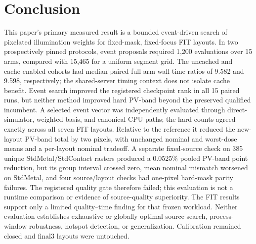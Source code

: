 \documentclass[conference]{IEEEtran}
\begin{document}
\section{Conclusion}
This paper’s primary measured result is a bounded event-driven search of pixelated illumination weights for fixed-mask, fixed-focus FIT layouts. In two prospectively pinned protocols, event proposals required 1,200 evaluations over 15 arms, compared with 15,465 for a uniform segment grid. The uncached and cache-enabled cohorts had median paired full-arm wall-time ratios of 9.582 and 9.598, respectively; the shared-server timing context does not isolate cache benefit. Event search improved the registered checkpoint rank in all 15 paired runs, but neither method improved hard PV-band beyond the preserved qualified incumbent. A selected event vector was independently evaluated through direct-simulator, weighted-basis, and canonical-CPU paths; the hard counts agreed exactly across all seven FIT layouts. Relative to the reference it reduced the new-layout PV-band total by two pixels, with unchanged nominal and worst-dose means and a per-layout nominal tradeoff. A separate fixed-source check on 385 unique StdMetal/StdContact rasters produced a 0.0525\% pooled PV-band point reduction, but its group interval crossed zero, mean nominal mismatch worsened on StdMetal, and four source/layout checks had one-pixel hard-mask parity failures. The registered quality gate therefore failed; this evaluation is not a runtime comparison or evidence of source-quality superiority. The FIT results support only a limited quality--time finding for that frozen workload. Neither evaluation establishes exhaustive or globally optimal source search, process-window robustness, hotspot detection, or generalization. Calibration remained closed and final3 layouts were untouched.
\end{document}
